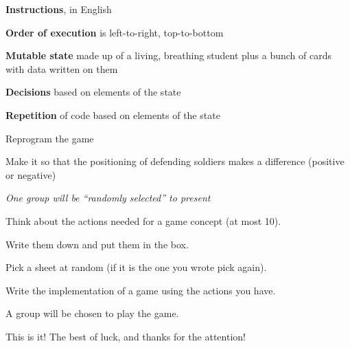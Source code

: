 \documentclass{beamer}
\begin{document}
\begin{slide}{
\item \textbf{Instructions}, in English
\item \textbf{Order of execution} is left-to-right, top-to-bottom
\item \textbf{Mutable state} made up of a living, breathing student plus a bunch of cards with data written on them
\item \textbf{Decisions} based on elements of the state 
\item \textbf{Repetition} of code based on elements of the state 
}\end{slide}

\begin{slide}{
\item Reprogram the game
\item Make it so that the positioning of defending soldiers makes a difference (positive or negative)
\item \textit{One group will be ``randomly selected'' to present}
}\end{slide}


\begin{slide}{
\item Think about the actions needed for a game concept (at most 10).
\item Write them down and put them in the box.
\item Pick a sheet at random (if it is the one you wrote pick again).
\item Write the implementation of a game using the actions you have.
\item A group will be chosen to play the game.
}\end{slide}

\begin{frame}{This is it!}
\center
\fontsize{18pt}{7.2}\selectfont
The best of luck, and thanks for the attention!
\end{frame}
\end{document}

